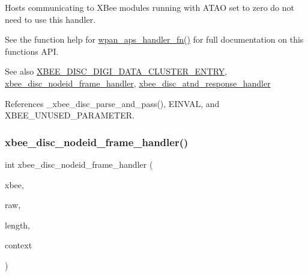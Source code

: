 Hosts communicating to X\+Bee modules running with A\+T\+AO set to zero do not need to use this handler.

See the function help for \hyperlink{group__wpan__aps_ga8575b0db762a5fbb858d4994c9b657e3}{wpan\+\_\+aps\+\_\+handler\+\_\+fn()} for full documentation on this function\textquotesingle{}s A\+PI.

\begin{DoxySeeAlso}{See also}
\hyperlink{group__xbee__discovery_ga8f678e29b22812632df7d3fa3d0f951a}{X\+B\+E\+E\+\_\+\+D\+I\+S\+C\+\_\+\+D\+I\+G\+I\+\_\+\+D\+A\+T\+A\+\_\+\+C\+L\+U\+S\+T\+E\+R\+\_\+\+E\+N\+T\+RY}, \hyperlink{group__xbee__discovery_gac15854e05ef3f80d6ddae653065c0a40}{xbee\+\_\+disc\+\_\+nodeid\+\_\+frame\+\_\+handler}, \hyperlink{group__xbee__discovery_ga6d1190133ded980a4eeca2034508c8a5}{xbee\+\_\+disc\+\_\+atnd\+\_\+response\+\_\+handler} 
\end{DoxySeeAlso}


References \+\_\+xbee\+\_\+disc\+\_\+parse\+\_\+and\+\_\+pass(), E\+I\+N\+V\+AL, and X\+B\+E\+E\+\_\+\+U\+N\+U\+S\+E\+D\+\_\+\+P\+A\+R\+A\+M\+E\+T\+ER.

\mbox{\label{group__xbee__discovery_gac15854e05ef3f80d6ddae653065c0a40}} 
\subsubsection{\texorpdfstring{xbee\+\_\+disc\+\_\+nodeid\+\_\+frame\+\_\+handler()}{xbee\_disc\_nodeid\_frame\_handler()}}
{\footnotesize\ttfamily int xbee\+\_\+disc\+\_\+nodeid\+\_\+frame\+\_\+handler (\begin{DoxyParamCaption}\item[{\hyperlink{structxbee__dev__t}{xbee\+\_\+dev\+\_\+t} $\ast$}]{xbee,  }\item[{const void \hyperlink{group__hal_gaef060b3456fdcc093a7210a762d5f2ed}{F\+AR} $\ast$}]{raw,  }\item[{\hyperlink{group__hal__dos_ga5a8b2dc9e45a9ee81a94ef304fb62505}{uint16\+\_\+t}}]{length,  }\item[{void \hyperlink{group__hal_gaef060b3456fdcc093a7210a762d5f2ed}{F\+AR} $\ast$}]{context }\end{DoxyParamCaption})}



